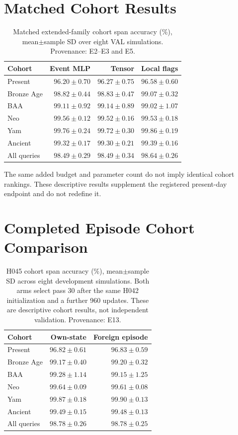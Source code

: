 \documentclass[letterpaper]{article}
\begin{document}


\appendix
\section{Matched Cohort Results}
\label{app:matched}
\begin{table}[t]
\centering
\small
\begin{tabular}{lrrr}
\toprule
Cohort & Event MLP & Tensor & Local flags \\
\midrule
Present & $96.20\pm0.70$ & $96.27\pm0.75$ & $96.58\pm0.60$ \\
Bronze Age & $98.82\pm0.44$ & $98.83\pm0.47$ & $99.07\pm0.32$ \\
BAA & $99.11\pm0.92$ & $99.14\pm0.89$ & $99.02\pm1.07$ \\
Neo & $99.56\pm0.12$ & $99.52\pm0.16$ & $99.53\pm0.18$ \\
Yam & $99.76\pm0.24$ & $99.72\pm0.30$ & $99.86\pm0.19$ \\
Ancient & $99.32\pm0.17$ & $99.30\pm0.21$ & $99.39\pm0.16$ \\
All queries & $98.49\pm0.29$ & $98.49\pm0.34$ & $98.64\pm0.26$ \\
\bottomrule
\end{tabular}
\caption{Matched extended-family cohort span accuracy (\%), mean$\pm$sample SD over eight VAL simulations. Provenance: E2--E3 and E5.}
\label{tab:matchedcohorts}
\end{table}

The same added budget and parameter count do not imply identical cohort rankings. These descriptive results supplement the registered present-day endpoint and do not redefine it.

\section{Completed Episode Cohort Comparison}
\begin{table}[t]
\centering
\small
\begin{tabular}{lrr}
\toprule
Cohort & Own-state & Foreign episode \\
\midrule
Present & $96.82\pm0.61$ & $96.83\pm0.59$ \\
Bronze Age & $99.17\pm0.40$ & $99.20\pm0.32$ \\
BAA & $99.28\pm1.14$ & $99.15\pm1.25$ \\
Neo & $99.64\pm0.09$ & $99.61\pm0.08$ \\
Yam & $99.87\pm0.18$ & $99.90\pm0.13$ \\
Ancient & $99.49\pm0.15$ & $99.48\pm0.13$ \\
All queries & $98.78\pm0.26$ & $98.78\pm0.25$ \\
\bottomrule
\end{tabular}
\caption{H045 cohort span accuracy (\%), mean$\pm$sample SD across eight development simulations. Both arms select pass 30 after the same H042 initialization and a further 960 updates. These are descriptive cohort results, not independent validation. Provenance: E13.}
\label{tab:episodecohorts}
\end{table}
\end{document}
